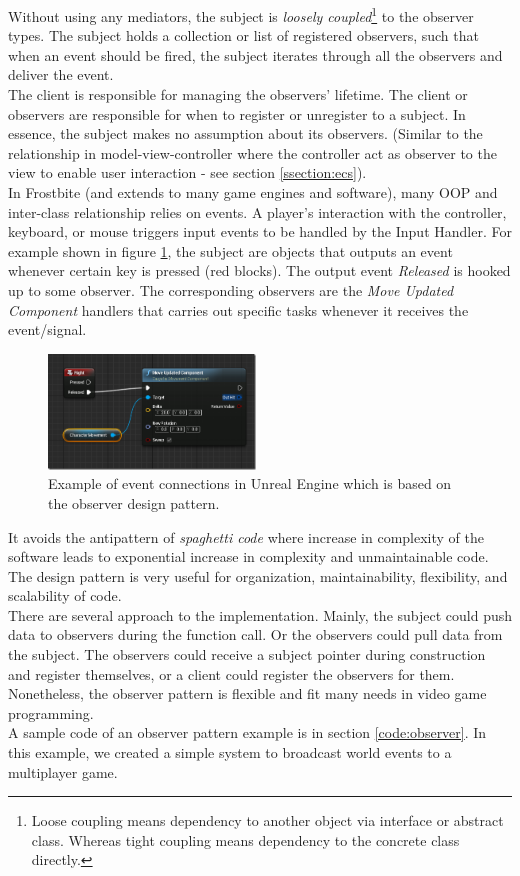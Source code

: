 \begin{multicols}{2}
Without using any mediators, the subject is \textit{loosely coupled}\footnote{Loose coupling means dependency to another object via interface or abstract class. Whereas tight coupling means dependency to the concrete class directly.} to the observer types. The subject holds a collection or list of registered observers, such that when an event should be fired, the subject iterates through all the observers and deliver the event.\bs
\\
The client is responsible for managing the observers' lifetime. The client or observers are responsible for when to register or unregister to a subject. In essence, the subject makes no assumption about its observers. (Similar to the relationship in model-view-controller where the controller act as observer to the view to enable user interaction - see section \ref{ssection:ecs}).\bs
\\
In Frostbite (and extends to many game engines and software), many OOP and inter-class relationship relies on events. A player's interaction with the controller, keyboard, or mouse triggers input events to be handled by the Input Handler. For example shown in figure \ref{fig:unreal-input}, the subject are objects that outputs an event whenever certain key is pressed (red blocks). The output event \textit{Released} is hooked up to some observer. The corresponding observers are the \textit{Move Updated Component} handlers that carries out specific tasks whenever it receives the event/signal.

\begin{figure}[H]
	\centering
	\includegraphics[width=0.49\textwidth]{assets/unreal-input}
	\caption{Example of event connections in Unreal Engine which is based on the observer design pattern. \cite{gfs-input}}
	\label{fig:unreal-input}
\end{figure}

It avoids the antipattern of \textit{spaghetti code} where increase in complexity of the software leads to exponential increase in complexity and unmaintainable code. The design pattern is very useful for organization, maintainability, flexibility, and scalability of code.\bs
\\
There are several approach to the implementation. Mainly, the subject could push data to observers during the function call. Or the observers could pull data from the subject. The observers could receive a subject pointer during construction and register themselves, or a client could register the observers for them. Nonetheless, the observer pattern is flexible and fit many needs in video game programming.\bs
\\
A sample code of an observer pattern example is in section \ref{code:observer}. In this example, we created a simple system to broadcast world events to a multiplayer game.


\end{multicols}

